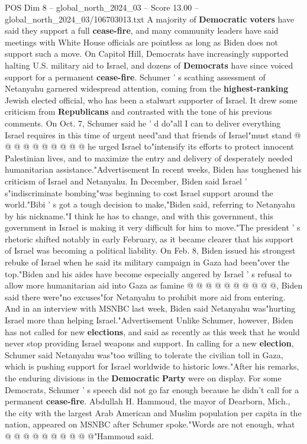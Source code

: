 \begin{textsample}{POS Dim 8 – global\_north\_2024\_03 – Score 13.00 – global\_north\_2024\_03/106703013.txt}
A majority of \textbf{Democratic} \textbf{voters} have said they support a full \textbf{cease-fire}, and many community leaders have said meetings with White House officials are pointless as long as Biden does not support such a move.
On Capitol Hill, Democrats have increasingly supported halting U.S. military aid to Israel, and dozens of \textbf{Democrats} have since voiced support for a permanent \textbf{cease-fire}.
Schumer ' s scathing assessment of Netanyahu garnered widespread attention, coming from the \textbf{highest-ranking} Jewish elected official, who has been a stalwart supporter of Israel.
It drew some criticism from \textbf{Republicans} and contrasted with the tone of his previous comments.
On Oct. 7, Schumer said he ' d do"all I can to deliver everything Israel requires in this time of urgent need"and that friends of Israel"must stand @ @ @ @ @ @ @ @ @ @ he urged Israel to"intensify its efforts to protect innocent Palestinian lives, and to maximize the entry and delivery of desperately needed humanitarian assistance."Advertisement In recent weeks, Biden has toughened his criticism of Israel and Netanyahu.
In December, Biden said Israel ' s"indiscriminate bombing"was beginning to cost Israel support around the world."Bibi ' s got a tough decision to make,"Biden said, referring to Netanyahu by his nickname."I think he has to change, and with this government, this government in Israel is making it very difficult for him to move."The president ' s rhetoric shifted notably in early February, as it became clearer that his support of Israel was becoming a political liability.
On Feb. 8, Biden issued his strongest rebuke of Israel when he said its military campaign in Gaza had been"over the top."Biden and his aides have become especially angered by Israel ' s refusal to allow more humanitarian aid into Gaza as famine @ @ @ @ @ @ @ @ @ @, Biden said there were"no excuses"for Netanyahu to prohibit more aid from entering.
And in an interview with MSNBC last week, Biden said Netanyahu was"hurting Israel more than helping Israel."Advertisement Unlike Schumer, however, Biden has not called for new \textbf{elections}, and said as recently as this week that he would never stop providing Israel weapons and support.
In calling for a new \textbf{election}, Schumer said Netanyahu was"too willing to tolerate the civilian toll in Gaza, which is pushing support for Israel worldwide to historic lows."After his remarks, the enduring divisions in the \textbf{Democratic} \textbf{Party} were on display.
For some Democrats, Schumer ' s speech did not go far enough because he didn't call for a permanent \textbf{cease-fire}.
Abdullah H.
Hammoud, the mayor of Dearborn, Mich., the city with the largest Arab American and Muslim population per capita in the nation, appeared on MSNBC after Schumer spoke."Words are not enough, what @ @ @ @ @ @ @ @ @ @"Hammoud said.

\end{textsample}
